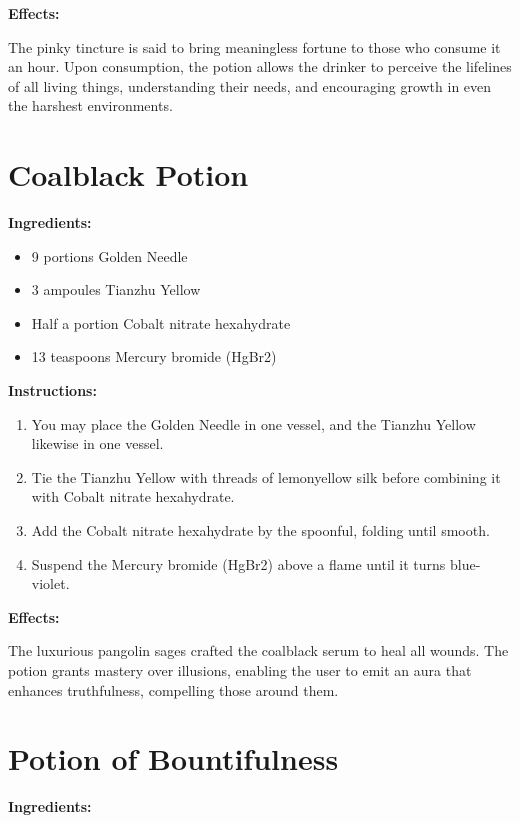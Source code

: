 \documentclass{article}
\begin{document}
\textbf{Effects:}

The pinky tincture is said to bring meaningless fortune to those who consume it an hour. Upon consumption, the potion allows the drinker to perceive the lifelines of all living things, understanding their needs, and encouraging growth in even the harshest environments.

\newpage
\section*{Coalblack Potion}

\textbf{Ingredients:}

\begin{itemize}
  \item 9 portions Golden Needle
  \item 3 ampoules Tianzhu Yellow
  \item Half a portion Cobalt nitrate hexahydrate
  \item 13 teaspoons Mercury bromide (HgBr2)
\end{itemize}

\textbf{Instructions:}

\begin{enumerate}
  \item You may place the Golden Needle in one vessel, and the Tianzhu Yellow likewise in one vessel.
  \item Tie the Tianzhu Yellow with threads of lemonyellow silk before combining it with Cobalt nitrate hexahydrate.
  \item Add the Cobalt nitrate hexahydrate by the spoonful, folding until smooth.
  \item Suspend the Mercury bromide (HgBr2) above a flame until it turns blue-violet.
\end{enumerate}

\textbf{Effects:}

The luxurious pangolin sages crafted the coalblack serum to heal all wounds. The potion grants mastery over illusions, enabling the user to emit an aura that enhances truthfulness, compelling those around them.

\newpage
\section*{Potion of Bountifulness}

\textbf{Ingredients:}
\end{document}
